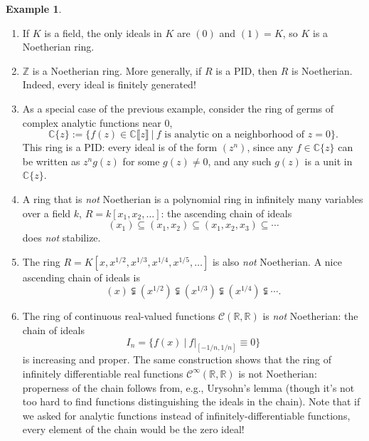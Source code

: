 \documentclass{amsart}[12pt]
\newcommand{\R}{{\mathbb{R}}}
\newcommand{\C}{\mathbb{C}}
\newcommand{\CC}{\mathbb{C}}
\newcommand{\NN}{\mathbb{N}}
\numberwithin{equation}{section}
\theoremstyle{plain} %
\theoremstyle{definition}
\newtheorem{ex}[equation]{Example}
\theoremstyle{remark}
\begin{document}
\begin{ex}
	\begin{enumerate}
		\item If $K$ is a field, the only ideals in $K$ are $(0)$ and $(1)=K$, so $K$ is a Noetherian ring.
		\item $\mathbb{Z}$ is a Noetherian ring. More generally, if $R$ is a PID, then $R$ is Noetherian. Indeed, every ideal is finitely generated!
		\item As a special case of the previous example, consider the ring of germs of complex analytic functions near $0$, \index{$\C\{z\}$} 
		\[\C\{z\} := \{ f(z) \in \C\llbracket z \rrbracket  \ | \ f \text{ is analytic on a neighborhood of $z=0$}\}.\]
		 This ring is a PID: every ideal is of the form $(z^n)$, since any $f\in \C\{z\}$ can be written as $z^n g(z)$ for some $g(z)\neq 0$, and any such $g(z)$ is a unit in $\C\{z\}$.
		\item A ring that is \emph{not} Noetherian is a polynomial ring in infinitely many variables over a field $k$, $R = k[x_1, x_2, \ldots]$: the ascending chain of ideals 
		\[(x_1)\subseteq (x_1,x_2) \subseteq (x_1,x_2,x_3) \subseteq \cdots\]
		does \emph{not} stabilize.
		\item The ring $R=K[x,x^{1/2},x^{1/3},x^{1/4},x^{1/5},\dots]$ is also \emph{not} Noetherian. A nice ascending chain of ideals is
		\[ (x) \subsetneqq (x^{1/2}) \subsetneqq (x^{1/3})\subsetneqq (x^{1/4}) \subsetneqq \cdots.\]
		\item The ring of continuous real-valued functions $\mathcal{C}(\R,\R)$\index{$\mathcal{C}(\R,\R)$} is \emph{not} Noetherian: the chain of ideals 
		\[I_{n}=\{ f(x) \ | \ f|_{[-1/n,1/n]}\equiv 0 \}\]
		is increasing and proper. The same construction shows that the ring of infinitely differentiable real functions $\mathcal{C}^{\infty}(\R,\R)$\index{$\mathcal{C}^{\infty}(\R,\R)$} is not Noetherian: properness of the chain follows from, e.g., Urysohn's lemma (though it's not too hard to find functions distinguishing the ideals in the chain). Note that if we asked for analytic functions instead of infinitely-differentiable functions, every element of the chain would be the zero ideal!
	\end{enumerate}
\end{ex}
\end{document}
